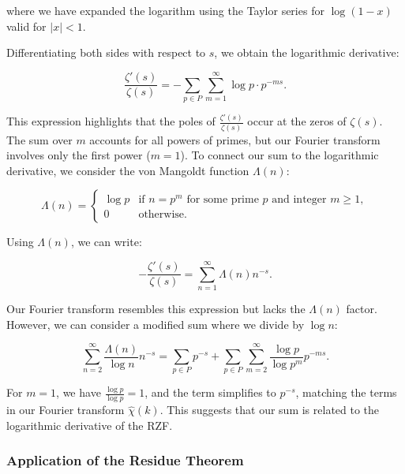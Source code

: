 \documentclass[11pt, oneside]{article}
\begin{document}
where we have expanded the logarithm using the Taylor series for $\log(1 - x)$ valid for $|x| < 1$.

Differentiating both sides with respect to $s$, we obtain the logarithmic derivative:

\begin{equation}
\frac{\zeta'(s)}{\zeta(s)} = -\sum_{p \in P} \sum_{m=1}^\infty \log p \cdot p^{-m s}.
\end{equation}

This expression highlights that the poles of $\frac{\zeta'(s)}{\zeta(s)}$ occur at the zeros of $\zeta(s)$. The sum over $m$ accounts for all powers of primes, but our Fourier transform involves only the first power ($m = 1$). To connect our sum to the logarithmic derivative, we consider the von Mangoldt function $\Lambda(n)$:

\begin{equation}
\Lambda(n) = \begin{cases}
\log p & \text{if } n = p^m \text{ for some prime } p \text{ and integer } m \geq 1, \\
0 & \text{otherwise}.
\end{cases}
\end{equation}

Using $\Lambda(n)$, we can write:

\begin{equation}
-\frac{\zeta'(s)}{\zeta(s)} = \sum_{n=1}^\infty \Lambda(n) n^{-s}.
\end{equation}

Our Fourier transform resembles this expression but lacks the $\Lambda(n)$ factor. However, we can consider a modified sum where we divide by $\log n$:

\begin{equation}
\sum_{n=2}^\infty \frac{\Lambda(n)}{\log n} n^{-s} = \sum_{p \in P} p^{-s} + \sum_{p \in P} \sum_{m=2}^\infty \frac{\log p}{\log p^m} p^{-m s}.
\end{equation}

For $m = 1$, we have $\frac{\log p}{\log p} = 1$, and the term simplifies to $p^{-s}$, matching the terms in our Fourier transform $\hat{\chi}(k)$. This suggests that our sum is related to the logarithmic derivative of the RZF.

\subsubsection{Application of the Residue Theorem}
\end{document}
